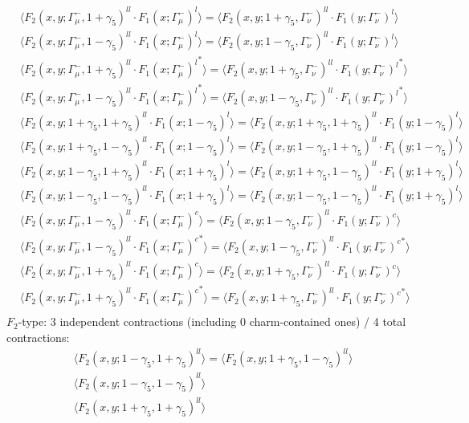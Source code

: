 \begin{align*}
&\Big\langle F_2(x,y;\Gamma_\mu^-,1+\gamma_5)^{ll} \cdot F_1(x;\Gamma_\mu^-)^l\Big\rangle
=\Big\langle F_2(x,y;1+\gamma_5,\Gamma_\nu^-)^{ll} \cdot F_1(y;\Gamma_\nu^-)^l\Big\rangle\\
&\Big\langle F_2(x,y;\Gamma_\mu^-,1-\gamma_5)^{ll} \cdot F_1(x;\Gamma_\mu^-)^l\Big\rangle
=\Big\langle F_2(x,y;1-\gamma_5,\Gamma_\nu^-)^{ll} \cdot F_1(y;\Gamma_\nu^-)^l\Big\rangle\\
&\Big\langle F_2(x,y;\Gamma_\mu^-,1+\gamma_5)^{ll} \cdot {F_1(x;\Gamma_\mu^-)^l}^*\Big\rangle
=\Big\langle F_2(x,y;1+\gamma_5,\Gamma_\nu^-)^{ll} \cdot {F_1(y;\Gamma_\nu^-)^l}^*\Big\rangle\\
&\Big\langle F_2(x,y;\Gamma_\mu^-,1-\gamma_5)^{ll} \cdot {F_1(x;\Gamma_\mu^-)^l}^*\Big\rangle
=\Big\langle F_2(x,y;1-\gamma_5,\Gamma_\nu^-)^{ll} \cdot {F_1(y;\Gamma_\nu^-)^l}^*\Big\rangle\\
&\Big\langle F_2(x,y;1+\gamma_5,1+\gamma_5)^{ll} \cdot F_1(x;1-\gamma_5)^l\Big\rangle
=\Big\langle F_2(x,y;1+\gamma_5,1+\gamma_5)^{ll} \cdot F_1(y;1-\gamma_5)^l\Big\rangle\\
&\Big\langle F_2(x,y;1+\gamma_5,1-\gamma_5)^{ll} \cdot F_1(x;1-\gamma_5)^l\Big\rangle
=\Big\langle F_2(x,y;1-\gamma_5,1+\gamma_5)^{ll} \cdot F_1(y;1-\gamma_5)^l\Big\rangle\\
&\Big\langle F_2(x,y;1-\gamma_5,1+\gamma_5)^{ll} \cdot F_1(x;1+\gamma_5)^l\Big\rangle
=\Big\langle F_2(x,y;1+\gamma_5,1-\gamma_5)^{ll} \cdot F_1(y;1+\gamma_5)^l\Big\rangle\\
&\Big\langle F_2(x,y;1-\gamma_5,1-\gamma_5)^{ll} \cdot F_1(x;1+\gamma_5)^l\Big\rangle
=\Big\langle F_2(x,y;1-\gamma_5,1-\gamma_5)^{ll} \cdot F_1(y;1+\gamma_5)^l\Big\rangle\\
&\Big\langle F_2(x,y;\Gamma_\mu^-,1-\gamma_5)^{ll} \cdot F_1(x;\Gamma_\mu^-)^c\Big\rangle
=\Big\langle F_2(x,y;1-\gamma_5,\Gamma_\nu^-)^{ll} \cdot F_1(y;\Gamma_\nu^-)^c\Big\rangle\\
&\Big\langle F_2(x,y;\Gamma_\mu^-,1-\gamma_5)^{ll} \cdot {F_1(x;\Gamma_\mu^-)^c}^*\Big\rangle
=\Big\langle F_2(x,y;1-\gamma_5,\Gamma_\nu^-)^{ll} \cdot {F_1(y;\Gamma_\nu^-)^c}^*\Big\rangle\\
&\Big\langle F_2(x,y;\Gamma_\mu^-,1+\gamma_5)^{ll} \cdot F_1(x;\Gamma_\mu^-)^c\Big\rangle
=\Big\langle F_2(x,y;1+\gamma_5,\Gamma_\nu^-)^{ll} \cdot F_1(y;\Gamma_\nu^-)^c\Big\rangle\\
&\Big\langle F_2(x,y;\Gamma_\mu^-,1+\gamma_5)^{ll} \cdot {F_1(x;\Gamma_\mu^-)^c}^*\Big\rangle
=\Big\langle F_2(x,y;1+\gamma_5,\Gamma_\nu^-)^{ll} \cdot {F_1(y;\Gamma_\nu^-)^c}^*\Big\rangle\\
\end{align*}
$F_2$-type: 3 independent contractions (including 0 charm-contained ones) / 4 total contractions:
\begin{align*}
&\Big\langle F_2(x,y;1-\gamma_5,1+\gamma_5)^{ll}\Big\rangle
=\Big\langle F_2(x,y;1+\gamma_5,1-\gamma_5)^{ll}\Big\rangle\\
&\Big\langle F_2(x,y;1-\gamma_5,1-\gamma_5)^{ll}\Big\rangle\\
&\Big\langle F_2(x,y;1+\gamma_5,1+\gamma_5)^{ll}\Big\rangle\\
\end{align*}

